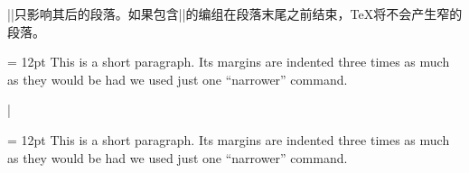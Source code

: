 %


|\narrower|只影响其后的段落。如果包含|\narrower|的编组在段落末尾之前结束，\TeX{}将不会产生窄的段落。

\example
{\parindent = 12pt \narrower\narrower\narrower
This is a short paragraph. Its margins are indented
three times as much as they would be
had we used just one ``narrower'' command.\par}
|
\produces
{\parindent = 12pt \narrower\narrower\narrower
This is a short paragraph. Its margins are indented
three times as much as they would be
had we used just one ``narrower'' command.\par}
\endexample\enddesc

